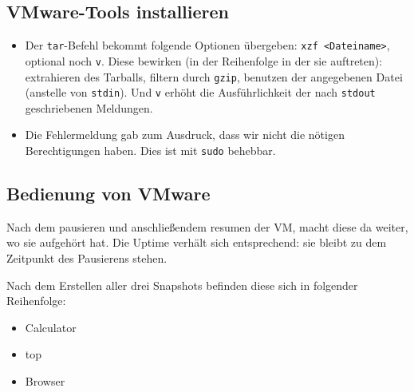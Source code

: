 \documentclass[12pt,a4paper]{article}
\begin{document}
\subsection{VMware-Tools installieren}
\begin{itemize}
    \item Der \texttt{tar}-Befehl bekommt folgende Optionen übergeben:
        \texttt{xzf <Dateiname>}, optional noch \texttt{v}. Diese bewirken
        (in der Reihenfolge in der sie auftreten): extrahieren des Tarballs,
        filtern durch \texttt{gzip}, benutzen der angegebenen Datei
        (anstelle von \texttt{stdin}). Und \texttt{v} erhöht die Ausführlichkeit
        der nach \texttt{stdout} geschriebenen Meldungen.
    \item Die Fehlermeldung gab zum Ausdruck, dass wir nicht die nötigen Berechtigungen
        haben. Dies ist mit \texttt{sudo} behebbar.
\end{itemize}
\subsection{Bedienung von VMware}
    Nach dem pausieren und anschließendem resumen der VM, macht diese da weiter,
    wo sie aufgehört hat. Die Uptime verhält sich entsprechend: sie bleibt zu dem
    Zeitpunkt des Pausierens stehen.

    Nach dem Erstellen aller drei Snapshots befinden diese sich in folgender Reihenfolge:
    \begin{itemize}
        \item Calculator
        \item top
        \item Browser
    \end{itemize}
\end{document}
